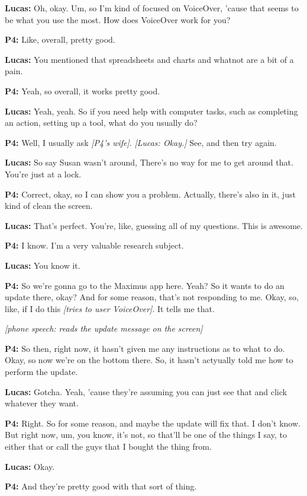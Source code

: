 \textbf{Lucas:} Oh, okay. Um, so I'm kind of focused on VoiceOver, 'cause that seems to be what you use the most. How does VoiceOver work for you?

\textbf{P4:} Like, overall, pretty good.

\textbf{Lucas:} You mentioned that spreadsheets and charts and whatnot are a bit of a pain.

\textbf{P4:} Yeah, so overall, it works pretty good.

\textbf{Lucas:} Yeah, yeah. So if you need help with computer tasks, such as completing an action, setting up a tool, what do you usually do?

\textbf{P4:} Well, I usually ask \textit{[P4's wife]}. \textit{[Lucas: Okay.]} See, and then try again.

\textbf{Lucas:} So say Susan wasn't around, There's no way for me to get around that. You're just at a lock.

\textbf{P4:} Correct, okay, so I can show you a problem. Actually, there's also in it, just kind of clean the screen.

\textbf{Lucas:} That's perfect. You're, like, guessing all of my questions. This is awesome.

\textbf{P4:} I know. I'm a very valuable research subject.

\textbf{Lucas:} You know it.

\textbf{P4:} So we're gonna go to the Maximus app here. Yeah? So it wants to do an update there, okay? And for some reason, that's not responding to me. Okay, so, like, if I do this \textit{[tries to user VoiceOver]}. It tells me that.

\textit{[phone speech: reads the update message on the screen]}

\textbf{P4:} So then, right now, it hasn't given me any instructions as to what to do. Okay, so now we're on the bottom there. So, it hasn't actyually told me how to perform the update.

\textbf{Lucas:} Gotcha. Yeah, 'cause they're assuming you can just see that and click whatever they want.

\textbf{P4:} Right. So for some reason, and maybe the update will fix that. I don't know. But right now, um, you know, it's not, so that'll be one of the things I say, to either that or call the guys that I bought the thing from.

\textbf{Lucas:} Okay.

\textbf{P4:} And they're pretty good with that sort of thing.

